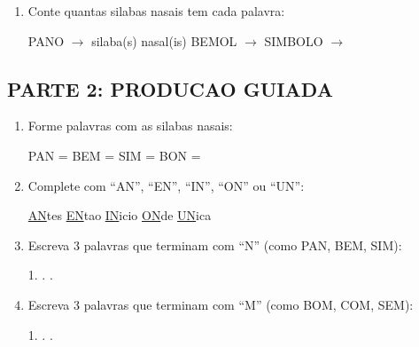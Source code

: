 \begin{exercicio}
\begin{enumerate}
  \item Conte quantas silabas nasais tem cada palavra:
  \begin{center}
  PANO $\rightarrow$ \underline{\hspace{1cm}} silaba(s) nasal(is) \quad BEMOL $\rightarrow$ \underline{\hspace{1cm}} \quad SIMBOLO $\rightarrow$ \underline{\hspace{1cm}}
  \end{center}
\end{enumerate}

\subsection*{PARTE 2: PRODUCAO GUIADA}

\begin{enumerate}[resume]
  \item Forme palavras com as silabas nasais:
  \begin{center}
  PAN = \underline{\hspace{2cm}} \quad BEM = \underline{\hspace{2cm}} \quad SIM = \underline{\hspace{2cm}} \quad BON = \underline{\hspace{2cm}}
  \end{center}

  \item Complete com ``AN'', ``EN'', ``IN'', ``ON'' ou ``UN'':
  \begin{center}
  \underline{AN}tes \quad \underline{EN}tao \quad \underline{IN}icio \quad \underline{ON}de \quad \underline{UN}ica
  \end{center}

  \item Escreva 3 palavras que terminam com ``N'' (como PAN, BEM, SIM):
  \begin{center}
  1. \underline{\hspace{3cm}} . \underline{\hspace{3cm}} . \underline{\hspace{3cm}}
  \end{center}

  \item Escreva 3 palavras que terminam com ``M'' (como BOM, COM, SEM):
  \begin{center}
  1. \underline{\hspace{3cm}} . \underline{\hspace{3cm}} . \underline{\hspace{3cm}}
  \end{center}


\end{enumerate}
\end{exercicio}
